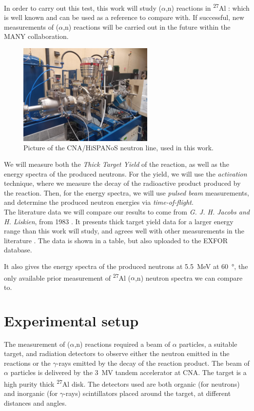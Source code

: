 \documentclass[a4paper,12pt]{report}
\newcommand{\an}{($\alpha$,n) }
\newcommand{\Aliso}{\textsuperscript{27}Al }
\begin{document}
In order to carry out this test, this work will study \an reactions in \Aliso: which is well known and can be used as a reference to compare with.
If successful, new measurements of \an reactions will be carried out in the future within the MANY collaboration.
\\

\begin{figure}[H]
	\centering
	\includegraphics[width=0.6\textwidth]{neutronline_foto.jpg}
	\caption{Picture of the CNA/HiSPANoS neutron line, used in this work.}
	\label{neutronline_foto}
\end{figure}

We will measure both the \textit{Thick Target Yield} of the reaction, as well as the energy spectra of the produced neutrons.
For the yield, we will use the \textit{activation} technique, where we measure the decay of the radioactive product produced by the reaction.
Then, for the energy spectra, we will use \textit{pulsed beam} measurements, and determine the produced neutron energies via \textit{time-of-flight}.
\\

The literature data we will compare our results to come from \textit{G. J. H. Jacobs and H. Liskien}, from 1983 \cite{jacobs}.
It presents thick target yield data for a larger energy range than this work will study, and agrees well with other measurements in the literature \cite{jacobssupport1, jacobssupport2}.
The data is shown in a table, but also uploaded to the EXFOR database.

It also gives the energy spectra of the produced neutrons at \qty{5.5}{\MeV} at \qty{60}{\degree}, the only available prior measurement of \Aliso\an neutron spectra we can compare to.


\chapter{Experimental setup}
The measurement of \an reactions required a beam of $\alpha$ particles, a suitable target, and radiation detectors to observe either the neutron emitted in the reactions or the $\gamma$-rays emitted by the decay of the reaction product.
The beam of $\alpha$ particles is delivered by the \qty{3}{\mega\volt} tandem accelerator at CNA.
The target is a high purity thick \Aliso disk.
The detectors used are both organic (for neutrons) and inorganic (for $\gamma$-rays) scintillators placed around the target, at different distances and angles.
\end{document}
